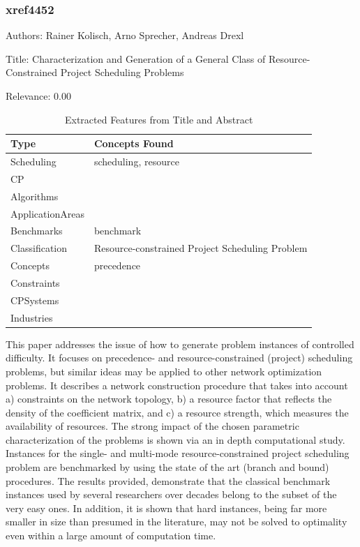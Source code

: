 \subsubsection{xref4452}
\label{mw:xref4452}

Authors: Rainer Kolisch, Arno Sprecher, Andreas Drexl

Title: Characterization and Generation of a General Class of Resource-Constrained Project Scheduling Problems

Relevance:  0.00

{\scriptsize
\begin{longtable}{p{2cm}p{20cm}}
\caption{Extracted Features from Title and Abstract}\\ \toprule
Type & Concepts Found\\ \midrule
\endhead
\bottomrule
\endfoot
Scheduling & scheduling, resource\\ 
CP & \\ 
Algorithms & \\ 
ApplicationAreas & \\ 
Benchmarks & benchmark\\ 
Classification & Resource-constrained Project Scheduling Problem\\ 
Concepts & precedence\\ 
Constraints & \\ 
CPSystems & \\ 
Industries & \\ 
\end{longtable}
}

  This paper addresses the issue of how to generate problem instances of controlled difficulty. It focuses on precedence- and resource-constrained (project) scheduling problems, but similar ideas may be applied to other network optimization problems. It describes a network construction procedure that takes into account a) constraints on the network topology, b) a resource factor that reflects the density of the coefficient matrix, and c) a resource strength, which measures the availability of resources. The strong impact of the chosen parametric characterization of the problems is shown via an in depth computational study. Instances for the single- and multi-mode resource-constrained project scheduling problem are benchmarked by using the state of the art (branch and bound) procedures. The results provided, demonstrate that the classical benchmark instances used by several researchers over decades belong to the subset of the very easy ones. In addition, it is shown that hard instances, being far more smaller in size than presumed in the literature, may not be solved to optimality even within a large amount of computation time.  


